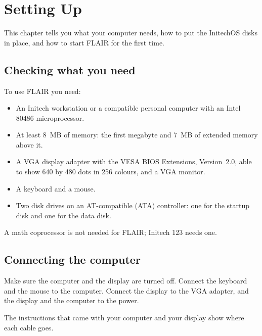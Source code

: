 \chapter{Setting Up}
\IsThisGoodForTheCompany

This chapter tells you what your computer needs, how to put the InitechOS
disks in place, and how to start FLAIR for the first time.

\section{Checking what you need}
To use FLAIR you need:
\begin{itemize}
\item An Initech workstation or a compatible personal computer with an
  Intel 80486 microprocessor.
\item At least 8~MB of memory: the first megabyte and 7~MB of extended
  memory above it.
\item A VGA display adapter with the VESA BIOS Extensions, Version~2.0,
  able to show 640 by 480 dots in 256 colours, and a VGA monitor.
\item A keyboard and a mouse.
\item Two disk drives on an AT-compatible (ATA) controller: one for the
  startup disk and one for the data disk.
\end{itemize}
A math coprocessor is not needed for FLAIR; Initech 123 needs one.

\section{Connecting the computer}
\begin{TaskSteps}
\Step Make sure the computer and the display are turned off.
\Step Connect the keyboard and the mouse to the computer.
\Step Connect the display to the VGA adapter, and the display and the
computer to the power.
\end{TaskSteps}
The instructions that came with your computer and your display show where
each cable goes.

